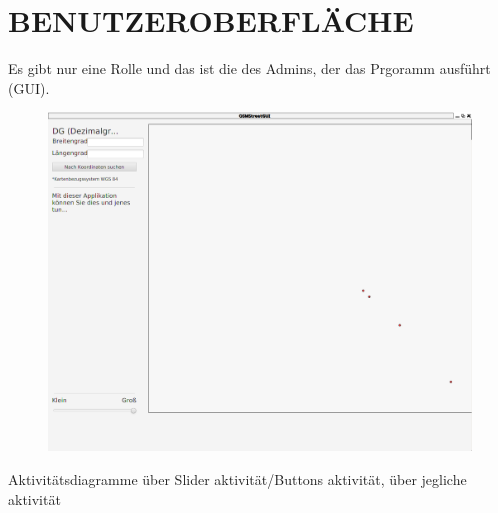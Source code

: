 	\section{\Large BENUTZEROBERFLÄCHE}
	Es gibt nur eine Rolle und das ist die des Admins, der das Prgoramm ausführt (GUI).
	\begin{figure}[H]
	\centering
	\includegraphics[width=0.7\linewidth]{images/GUI}
	\caption{}
	\label{fig:GUI}
	\end{figure}
	Aktivitätsdiagramme über Slider aktivität/Buttons aktivität, über jegliche aktivität
	
	
